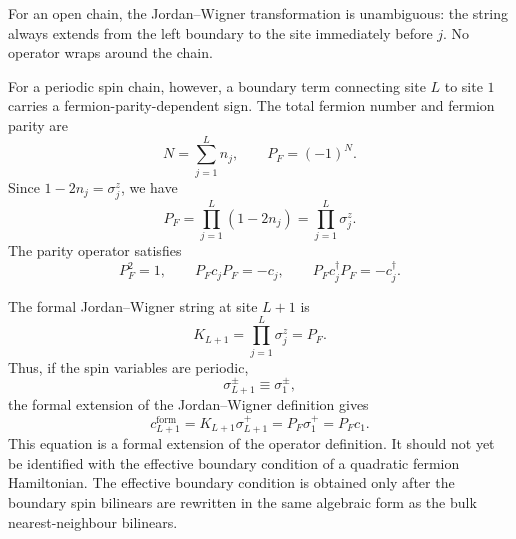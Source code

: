 For an open chain, the Jordan--Wigner transformation is unambiguous: the string
always extends from the left boundary to the site immediately before \(j\). No operator
wraps around the chain.

For a periodic spin chain, however, a boundary term connecting site \(L\) to site \(1\)
carries a fermion-parity-dependent sign. The total fermion number and fermion parity
are
\begin{equation}
    N=\sum_{j=1}^L n_j,
    \qquad
    P_F=(-1)^N.
\end{equation}
Since \(1-2n_j=\sigma_j^z\), we have
\begin{equation}
\label{eq:fermion-parity-spin}
    P_F
    =
    \prod_{j=1}^L(1-2n_j)
    =
    \prod_{j=1}^L\sigma_j^z.
\end{equation}
The parity operator satisfies
\begin{equation}
    P_F^2=1,
    \qquad
    P_F c_j P_F=-c_j,
    \qquad
    P_F c_j^\dagger P_F=-c_j^\dagger.
\end{equation}

The formal Jordan--Wigner string at site \(L+1\) is
\begin{equation}
    K_{L+1}
    =
    \prod_{j=1}^L\sigma_j^z
    =
    P_F.
\end{equation}
Thus, if the spin variables are periodic,
\begin{equation}
    \sigma_{L+1}^\pm\equiv\sigma_1^\pm,
\end{equation}
the formal extension of the Jordan--Wigner definition gives
\begin{equation}
\label{eq:formal-boundary-fermion}
    c_{L+1}^{\mathrm{form}}
    =
    K_{L+1}\sigma_{L+1}^+
    =
    P_F\sigma_1^+
    =
    P_Fc_1 .
\end{equation}
This equation is a formal extension of the operator definition. It should not yet
be identified with the effective boundary condition of a quadratic fermion
Hamiltonian. The effective boundary condition is obtained only after the boundary
spin bilinears are rewritten in the same algebraic form as the bulk nearest-neighbour
bilinears.

